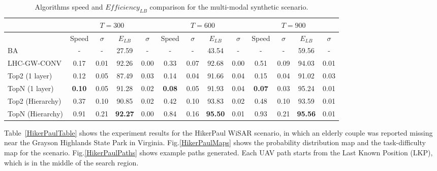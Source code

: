 \begin{center}
\begin{table*}[hbtp]
{
\scriptsize
\hfill{}
\setlength{\extrarowheight}{1.5pt}
\begin{tabular}
{|l|c|c|c|c|c|c|c|c|c|c|c|c|}
\hline
& \multicolumn{4}{|c|}{$T=300$} & \multicolumn{4}{|c|}{$T=600$} & \multicolumn{4}{|c|}{$T=900$} \\ 
\hline
& Speed & $\sigma$ & $\mathit{E_{LB}}$ & $\sigma$ & Speed & $\sigma$ & $\mathit{E_{LB}}$ & $\sigma$ & Speed & $\sigma$ & $\mathit{E_{LB}}$ & $\sigma$\\ 
\hline
BA & - & - & 27.59 & - & - & - & 43.54 & - & - & - & 59.56 & - \\ 
\hline
LHC-GW-CONV & 0.17 & 0.01 & 92.26 & 0.00 & 0.33 & 0.07 & 92.68 & 0.00 & 0.51 & 0.09 & 94.03 & 0.01 \\ 
\hline
Top2 (1 layer) & 0.12 & 0.05 & 87.49 & 0.03 & 0.14 & 0.04 & 91.66 & 0.04 & 0.15 & 0.04 & 91.02 & 0.03 \\ 
\hline
TopN (1 layer) & \textbf{0.10} & 0.05 & 91.28 & 0.02 & \textbf{0.08} & 0.05 & 91.93 & 0.04 & \textbf{0.07} & 0.03 & 95.24 & 0.01 \\ 
\hline
Top2 (Hierarchy) & 0.37 & 0.10 & 90.85 & 0.02 & 0.42 & 0.10 & 93.83 & 0.02 & 0.48 & 0.10 & 93.59 & 0.01  \\ 
\hline
TopN (Hierarchy) & 0.91 & 0.21 & \textbf{92.27} & 0.00 & 0.84 & 0.16 & \textbf{95.50} & 0.01 & 0.93 & 0.21 & \textbf{95.56} & 0.01 \\ 
\hline
\end{tabular}}
\medskip
\caption{Algorithms speed and $\mathit{Efficiency_{LB}}$ comparison for the multi-modal synthetic scenario.}
\label{TestCaseTable}
\vspace*{-5ex}
\end{table*}
\end{center}


Table~\ref{HikerPaulTable} shows the experiment results for the HikerPaul WiSAR scenario, in which an elderly couple was reported missing near the Grayson Highlands State Park in Virginia. Fig.\ref{HikerPaulMaps} shows the probability distribution map and the task-difficulty map for the scenario. Fig.\ref{HikerPaulPaths} shows example paths generated. Each UAV path starts from the Last Known Position (LKP), which is in the middle of the search region.


